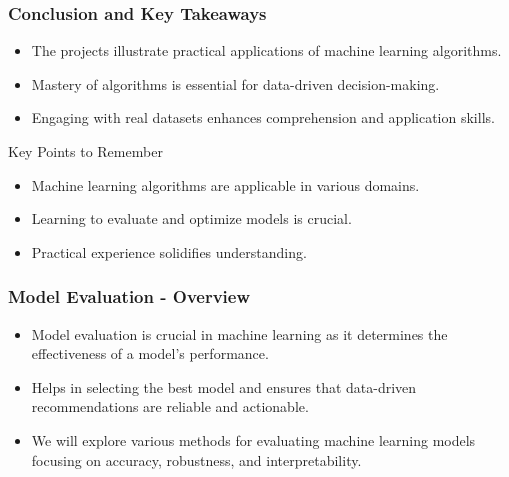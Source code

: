 \documentclass[aspectratio=169]{beamer}
\begin{document}
\begin{frame}[fragile]
    \frametitle{Conclusion and Key Takeaways}
    \begin{itemize}
        \item The projects illustrate practical applications of machine learning algorithms.
        \item Mastery of algorithms is essential for data-driven decision-making.
        \item Engaging with real datasets enhances comprehension and application skills.
    \end{itemize}
    
    \begin{block}{Key Points to Remember}
        \begin{itemize}
            \item Machine learning algorithms are applicable in various domains.
            \item Learning to evaluate and optimize models is crucial.
            \item Practical experience solidifies understanding.
        \end{itemize}
    \end{block}
\end{frame}

\begin{frame}[fragile]
    \frametitle{Model Evaluation - Overview}
    \begin{itemize}
        \item Model evaluation is crucial in machine learning as it determines the effectiveness of a model's performance.
        \item Helps in selecting the best model and ensures that data-driven recommendations are reliable and actionable.
        \item We will explore various methods for evaluating machine learning models focusing on accuracy, robustness, and interpretability.
    \end{itemize}
\end{frame}
\end{document}
